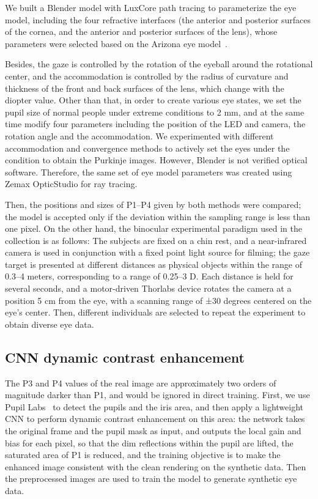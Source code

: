 \documentclass[sigconf, screen, review]{acmart}
\begin{document}
We built a Blender model with LuxCore path tracing to parameterize the eye model, including the four refractive interfaces (the anterior and posterior surfaces of the cornea, and the anterior and posterior surfaces of the lens), whose parameters were selected based on the Arizona eye model~\cite{Schwiegerling2004}.

Besides, the gaze is controlled by the rotation of the eyeball around the rotational center, and the accommodation is controlled by the radius of curvature and thickness of the front and back surfaces of the lens, which change with the diopter value. Other than that, in order to create various eye states, we set the pupil size of normal people under extreme conditions to 2 mm, and at the same time modify four parameters including the position of the LED and camera, the rotation angle and the accommodation. We experimented with different accommodation and convergence methods to actively set the eyes under the \VAC{} condition to obtain the Purkinje images. However, Blender is not verified optical software. Therefore, the same set of eye model parameters was created using Zemax OpticStudio for ray tracing. 

Then, the positions and sizes of P1–P4 given by both methods were compared; the model is accepted only if the deviation within the sampling range is less than one pixel. On the other hand, the binocular experimental paradigm used in the collection is as follows: The subjects are fixed on a chin rest, and a near-infrared camera is used in conjunction with a fixed point light source for filming; the gaze target is presented at different distances as physical objects within the range of 0.3–4 meters, corresponding to a range of 0.25–3 D. Each distance is held for several seconds, and a motor-driven Thorlabs device rotates the camera at a position 5 cm from the eye, with a scanning range of ±30 degrees centered on the eye’s center. Then, different individuals are selected to repeat the experiment to obtain diverse eye data.

\subsection{CNN dynamic contrast enhancement}
\label{sec:contrast_enhancement}

The P3 and P4 values of the real image are approximately two orders of magnitude darker than P1, and would be ignored in direct training. First, we use Pupil Labs~\cite{Kassner2014Pupil} to detect the pupils and the iris area, and then apply a lightweight CNN to perform dynamic contrast enhancement on this area: the network takes the original frame and the pupil mask as input, and outputs the local gain and bias for each pixel, so that the dim reflections within the pupil are lifted, the saturated area of P1 is reduced, and the training objective is to make the enhanced image consistent with the clean rendering on the synthetic data. Then the preprocessed images are used to train the \GS{} model to generate synthetic eye data.
\end{document}
